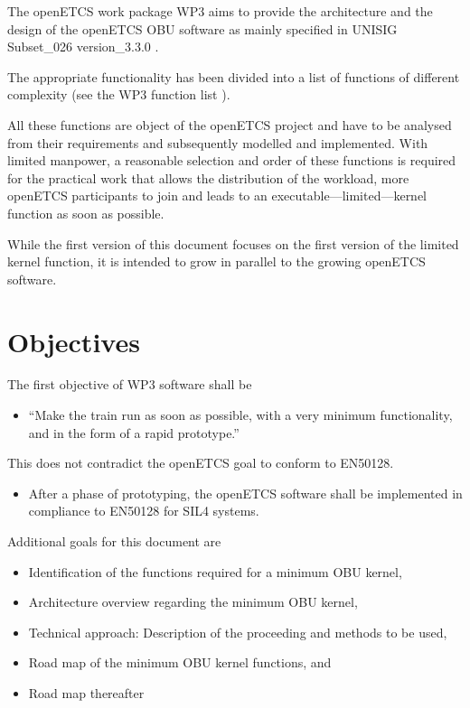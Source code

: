 \documentclass{template/openetcs_report}
\begin{document}
The openETCS work package WP3 aims to provide the architecture and the design of the openETCS OBU software as mainly specified in UNISIG Subset\_026 version\_3.3.0 \cite{subset-026}. 

The appropriate functionality has been divided into a list of functions of different complexity (see the WP3 function list \cite{functions}).

All these functions are object of the openETCS project and have to be analysed from their requirements and subsequently modelled and implemented. With limited manpower, a reasonable selection and order of these functions is required for the practical work that allows the distribution of the workload, more openETCS participants to join and leads to an executable---limited---kernel function as soon as possible. 

While the first version of this document focuses on the first version of the limited kernel function, it is intended to grow in parallel to the growing openETCS software.


\section{Objectives}
\label{sec:Objectives}



The first objective of WP3 software shall be
\begin{itemize}
	\item ``Make the train run as soon as possible, with a very minimum functionality, and in the form of a rapid prototype.''
\end{itemize}
This does not contradict the openETCS goal to conform to EN50128.
\begin{itemize}
	\item After a phase of prototyping, the openETCS software shall be implemented in compliance to EN50128 for SIL4 systems.
\end{itemize}
Additional goals for this document are
\begin{itemize}
	\item Identification of the functions required for a minimum OBU kernel,
	\item Architecture overview regarding the minimum OBU kernel,
	\item Technical approach: Description of the proceeding and methods to be used,
	\item Road map of the minimum OBU kernel functions, and
	\item Road map thereafter
\end{itemize}
\end{document}
